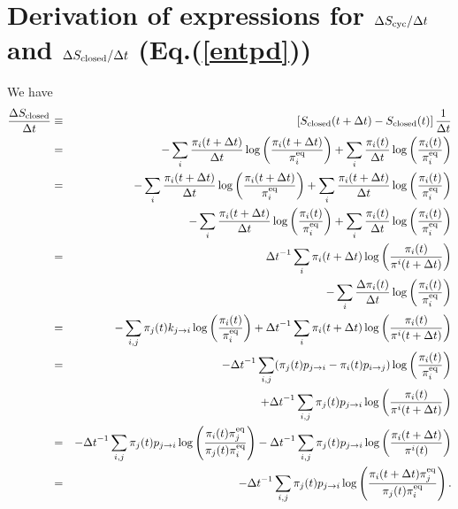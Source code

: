 \documentclass[aps,pre,amsmath,amssymb,floatfix,preprint,nofootinbib]{revtex4}
\begin{document}
\section{Derivation of expressions for $\Delta S_{\rm cyc}/\Delta t$ and $\Delta S_{\rm closed}/\Delta t$ (Eq.(\ref{entpd}))}\label{rem}
We have
\begin{eqnarray}
\frac{\Delta S_{\rm closed}}{\Delta t} &\equiv& \left[ S_{\rm closed}(t+\Delta t) - S_{\rm closed}(t)\right]\frac{1}{\Delta t} \nonumber\\
&=& -\sum_i \frac{\pi_i(t+\Delta t)}{\Delta t} \log \left(\frac{\pi_i(t+ \Delta t)}{\pi^{\rm eq}_i}\right) + \sum_i \frac{\pi_i(t)}{\Delta t} \log \left(\frac{\pi_i(t)}{\pi^{\rm eq}_i}\right) \nonumber\\
&=& -\sum_i \frac{\pi_i(t+\Delta t)}{\Delta t} \log \left(\frac{\pi_i(t+ \Delta t)}{\pi^{\rm eq}_i}\right) + \sum_i \frac{\pi_i(t+\Delta t)}{\Delta t} \log \left(\frac{\pi_i(t)}{\pi^{\rm eq}_i}\right) \nonumber\\
&& -\sum_i \frac{\pi_i(t+\Delta t)}{\Delta t} \log \left(\frac{\pi_i(t)}{\pi^{\rm eq}_i}\right)  + \sum_i \frac{\pi_i(t)}{\Delta t} \log \left(\frac{\pi_i(t)}{\pi^{\rm eq}_i}\right) \nonumber\\
&=& {\Delta t}^{-1}\sum_i {\pi_i(t+\Delta t)} \log \left(\frac{\pi_i(t)}{\pi^i (t+\Delta t)}\right)\nonumber\\
&&-\sum_i \frac{\Delta \pi_i(t)}{\Delta t} \log \left(\frac{\pi_i(t)}{\pi^{\rm eq}_i}\right) \nonumber\\ 
&=& -\sum_{i,j}  \pi_j(t) k_{j \to i} \log \left(\frac{\pi_i(t)}{\pi^{\rm eq}_i}\right) + {\Delta t}^{-1} \sum_i \pi_i(t+\Delta t)\log \left(\frac{\pi_i(t)}{\pi^i (t+\Delta t)}\right)\nonumber\\
&=& -{\Delta t}^{-1} \sum_{i,j} ( \pi_j(t) p_{j \to i} - \pi_i(t) p_{i \to j})  \log \left(\frac{\pi_i(t)}{\pi^{\rm eq}_i}\right) \nonumber\\
&&+ {\Delta t}^{-1} \sum_{i,j}  \pi_j(t) p_{j \to i} \log \left(\frac{\pi_i(t)}{\pi^i (t+\Delta t)}\right)\nonumber\\
&=& -{\Delta t}^{-1} \sum_{i,j} \pi_j(t) p_{j \to i}   \log \left(\frac{\pi_i(t) \pi^{\rm eq}_j}{\pi_j(t) \pi^{\rm eq}_i}\right) - {\Delta t}^{-1} \sum_{i,j}  \pi_j(t) p_{j \to i} \log \left(\frac{\pi_i(t+\Delta t)}{\pi^i (t)}\right)\nonumber\\
&=& -{\Delta t}^{-1} \sum_{i,j} \pi_j(t) p_{j \to i}   \log \left(\frac{\pi_i(t +\Delta t) \pi^{\rm eq}_j}{\pi_j(t) \pi^{\rm eq}_i}\right). \label{dScl}
\end{eqnarray}
\end{document}
